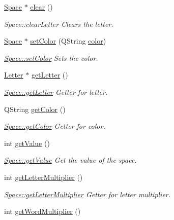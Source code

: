 \begin{DoxyCompactItemize}
\hyperlink{class_space}{Space} $\ast$ \hyperlink{class_space_ab18791c1da302a91c51477108be478b5}{clear} ()
\begin{DoxyCompactList}\small\item\em Space\-::clear\-Letter Clears the letter. \end{DoxyCompactList}\item 
\hyperlink{class_space}{Space} $\ast$ \hyperlink{class_space_a999461c4a81ac0028c5780e5c0f2aebf}{set\-Color} (Q\-String \hyperlink{class_space_aa26e0bcc52344b863a274af75651e454}{color})
\begin{DoxyCompactList}\small\item\em \hyperlink{class_space_a999461c4a81ac0028c5780e5c0f2aebf}{Space\-::set\-Color} Sets the color. \end{DoxyCompactList}\item 
\hyperlink{class_letter}{Letter} $\ast$ \hyperlink{class_space_a207bc025538775ce43bdcc0d8c4c3599}{get\-Letter} ()
\begin{DoxyCompactList}\small\item\em \hyperlink{class_space_a207bc025538775ce43bdcc0d8c4c3599}{Space\-::get\-Letter} Getter for letter. \end{DoxyCompactList}\item 
Q\-String \hyperlink{class_space_a32d88c2b9a0f1671ed3ebbd51ec9db09}{get\-Color} ()
\begin{DoxyCompactList}\small\item\em \hyperlink{class_space_a32d88c2b9a0f1671ed3ebbd51ec9db09}{Space\-::get\-Color} Getter for color. \end{DoxyCompactList}\item 
int \hyperlink{class_space_a9d17383ff1ff7ef3dd0be617ad69436c}{get\-Value} ()
\begin{DoxyCompactList}\small\item\em \hyperlink{class_space_a9d17383ff1ff7ef3dd0be617ad69436c}{Space\-::get\-Value} Get the value of the space. \end{DoxyCompactList}\item 
int \hyperlink{class_space_af35759deb33db2b7b7c77a40716c179f}{get\-Letter\-Multiplier} ()
\begin{DoxyCompactList}\small\item\em \hyperlink{class_space_af35759deb33db2b7b7c77a40716c179f}{Space\-::get\-Letter\-Multiplier} Getter for letter multiplier. \end{DoxyCompactList}\item 
int \hyperlink{class_space_a6a26a281a90288d56c83cc76b53cb6fb}{get\-Word\-Multiplier} ()

\end{DoxyCompactItemize}
